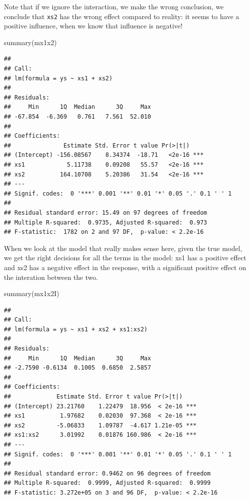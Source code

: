 \documentclass[
]{book}
\newenvironment{Shaded}{\begin{snugshade}}{\end{snugshade}}
\newcommand{\FunctionTok}[1]{\textcolor[rgb]{0.00,0.00,0.00}{#1}}
\newcommand{\NormalTok}[1]{#1}
\begin{document}
Note that if we ignore the interaction, we make the wrong conclusion, we conclude that \texttt{xs2} has the wrong effect compared to reality: it seems to have a positive influence, when we know that influence is negative!

\begin{Shaded}
\begin{Highlighting}[]
\FunctionTok{summary}\NormalTok{(mx1x2)}
\end{Highlighting}
\end{Shaded}

\begin{verbatim}
## 
## Call:
## lm(formula = ys ~ xs1 + xs2)
## 
## Residuals:
##     Min      1Q  Median      3Q     Max 
## -67.854  -6.369   0.761   7.561  52.010 
## 
## Coefficients:
##               Estimate Std. Error t value Pr(>|t|)    
## (Intercept) -156.08567    8.34374  -18.71   <2e-16 ***
## xs1            5.11738    0.09208   55.57   <2e-16 ***
## xs2          164.10708    5.20386   31.54   <2e-16 ***
## ---
## Signif. codes:  0 '***' 0.001 '**' 0.01 '*' 0.05 '.' 0.1 ' ' 1
## 
## Residual standard error: 15.49 on 97 degrees of freedom
## Multiple R-squared:  0.9735, Adjusted R-squared:  0.973 
## F-statistic:  1782 on 2 and 97 DF,  p-value: < 2.2e-16
\end{verbatim}

When we look at the model that really makes sense here, given the true model, we get the right decisions for all the terms in the model: xs1 has a positive effect and xs2 has a negative effect in the response, with a significant positive effect on the interation between the two.

\begin{Shaded}
\begin{Highlighting}[]
\FunctionTok{summary}\NormalTok{(mx1x2I)}
\end{Highlighting}
\end{Shaded}

\begin{verbatim}
## 
## Call:
## lm(formula = ys ~ xs1 + xs2 + xs1:xs2)
## 
## Residuals:
##     Min      1Q  Median      3Q     Max 
## -2.7590 -0.6134  0.1005  0.6850  2.5857 
## 
## Coefficients:
##             Estimate Std. Error t value Pr(>|t|)    
## (Intercept) 23.21760    1.22479  18.956  < 2e-16 ***
## xs1          1.97682    0.02030  97.368  < 2e-16 ***
## xs2         -5.06833    1.09787  -4.617 1.21e-05 ***
## xs1:xs2      3.01992    0.01876 160.986  < 2e-16 ***
## ---
## Signif. codes:  0 '***' 0.001 '**' 0.01 '*' 0.05 '.' 0.1 ' ' 1
## 
## Residual standard error: 0.9462 on 96 degrees of freedom
## Multiple R-squared:  0.9999, Adjusted R-squared:  0.9999 
## F-statistic: 3.272e+05 on 3 and 96 DF,  p-value: < 2.2e-16
\end{verbatim}
\end{document}
